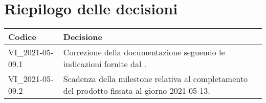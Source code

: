 \section{Riepilogo delle decisioni}
\setcounter{table}{-1}
{

\centering
\renewcommand{\arraystretch}{1.5}
\begin{longtable}{>{\centering}p{} >{}p{}}
\rowcolor{azzurro1}
\textbf{Codice} &
\centerline{\textbf{Decisione}}\\
\endhead

VI{\_}2021-05-09.1 & Correzione della documentazione seguendo le indicazioni fornite dal \VT{}.\\
VI{\_}2021-05-09.2 & Scadenza della milestone relativa al completamento del prodotto fissata al giorno 2021-05-13.\\
\end{longtable}
}